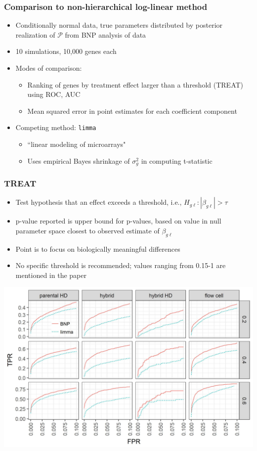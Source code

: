 \documentclass[handout]{beamer}
\begin{document}
\begin{frame}
  \frametitle{Comparison to non-hierarchical log-linear method}
  \begin{itemize}
    \item Conditionally normal data, true parameters distributed by posterior realization of $\mathcal{P}$ from BNP analysis of \citet{paschold} data
    \item 10 simulations, 10,000 genes each
    \item Modes of comparison:
    \begin{itemize}
      \item Ranking of genes by treatment effect larger than a threshold (TREAT) using ROC, AUC
      \item Mean squared error in point estimates for each coefficient component
    \end{itemize}
    \item Competing method: \texttt{limma} \citep{mccarthy}
    \begin{itemize}
      \item ``linear modeling of microarrays"
      \item Uses empirical Bayes shrinkage of $\sigma^2_g$ in computing t-statistic
    \end{itemize}
  \end{itemize}
\end{frame}

\begin{frame}
  \frametitle{TREAT}
  \begin{itemize}
    \pause\item Test hypothesis that an effect exceeds a threshold, i.e., $H_{g\ell}: |\beta_{g \ell}|>\tau$
    \pause\item p-value reported is upper bound for p-values, based on value in null parameter space closest to observed estimate of $\beta_{g\ell}$
    \pause\item Point is to focus on biologically meaningful differences
    \pause\item No specific threshold is recommended; values ranging from 0.15-1 are mentioned in the paper
  \end{itemize}
  \citep{treat}
\end{frame}

\begin{frame}
\includegraphics[width=\textwidth]{ss1-roc}
\end{frame}
\end{document}
